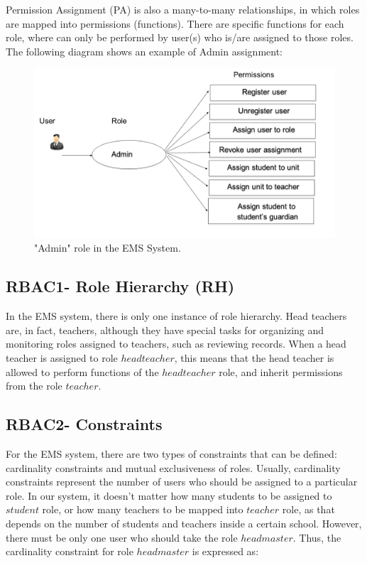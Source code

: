 Permission Assignment (PA) is also a many-to-many relationships, in which roles are mapped into permissions (functions).  There are specific functions for each role, where can only be performed by user(s) who is/are assigned to those roles.  The following diagram shows an example of Admin assignment:

\begin{figure}[bht]
\centering
\includegraphics[scale=0.26]{addAdmin.png}
\caption{"Admin" role in the EMS System.}
\label{fig:permstud}
\end{figure}


\subsection{RBAC1- Role Hierarchy (RH)}

In the EMS system, there is only one instance of role hierarchy.  Head teachers are, in fact, teachers, although they have special tasks for organizing and monitoring roles assigned to teachers, such as reviewing records.  When a head teacher is assigned to role $headteacher$, this means that the head teacher is allowed to perform functions of the $headteacher$ role, and inherit permissions from the role $teacher$.

\subsection{RBAC2- Constraints}

For the EMS system, there are two types of constraints that can be defined: cardinality constraints and mutual exclusiveness of roles.  Usually, cardinality constraints represent the number of users who should be assigned to a particular role.  In our system, it doesn't matter how many students to be assigned to $student$ role, or how many teachers to be mapped into $teacher$ role, as that depends on the number of students and teachers inside a certain school.  However, there must be only one user who should take the role $headmaster$.  Thus, the cardinality constraint for role $headmaster$ is expressed as:

